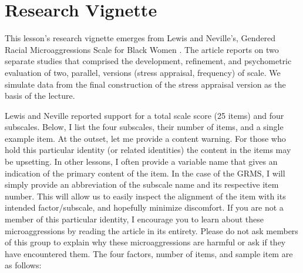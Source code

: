 \documentclass[
  english,
]{book}
\begin{document}
\hypertarget{research-vignette-6}{%
\section{Research Vignette}\label{research-vignette-6}}

This lesson's research vignette emerges from Lewis and Neville's, Gendered Racial Microaggressions Scale for Black Women \citeyearpar{lewis_construction_2015}. The article reports on two separate studies that comprised the development, refinement, and psychometric evaluation of two, parallel, versions (stress appraisal, frequency) of scale. We simulate data from the final construction of the stress appraisal version as the basis of the lecture.

Lewis and Neville \citeyearpar{lewis_construction_2015} reported support for a total scale score (25 items) and four subscales. Below, I list the four subscales, their number of items, and a single example item. At the outset, let me provide a content warning. For those who hold this particular identity (or related identities) the content in the items may be upsetting. In other lessons, I often provide a variable name that gives an indication of the primary content of the item. In the case of the GRMS, I will simply provide an abbreviation of the subscale name and its respective item number. This will allow us to easily inspect the alignment of the item with its intended factor/subscale, and hopefully minimize discomfort. If you are not a member of this particular identity, I encourage you to learn about these microaggressions by reading the article in its entirety. Please do not ask members of this group to explain why these microaggressions are harmful or ask if they have encountered them. The four factors, number of items, and sample item are as follows:
\end{document}
